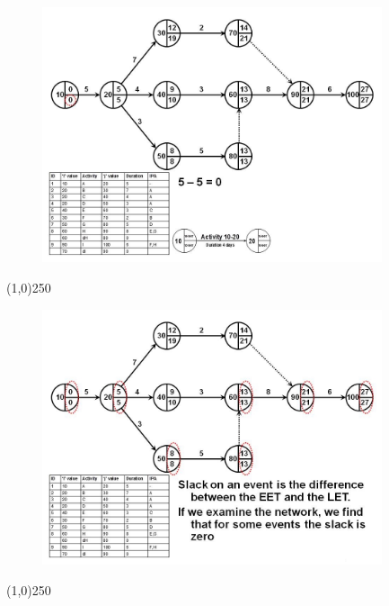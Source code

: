 \begin{frame}
\begin{figure}
	\centering
		\includegraphics[width = 10.0cm]{oldnotes/Slide120.jpg}
\end{figure}
\end{frame}
\begin{center}\line(1,0){250}\end{center}


\begin{frame}
\begin{figure}
	\centering
		\includegraphics[width = 10.0cm]{oldnotes/Slide121.jpg}
\end{figure}
\end{frame}
\begin{center}\line(1,0){250}\end{center}


